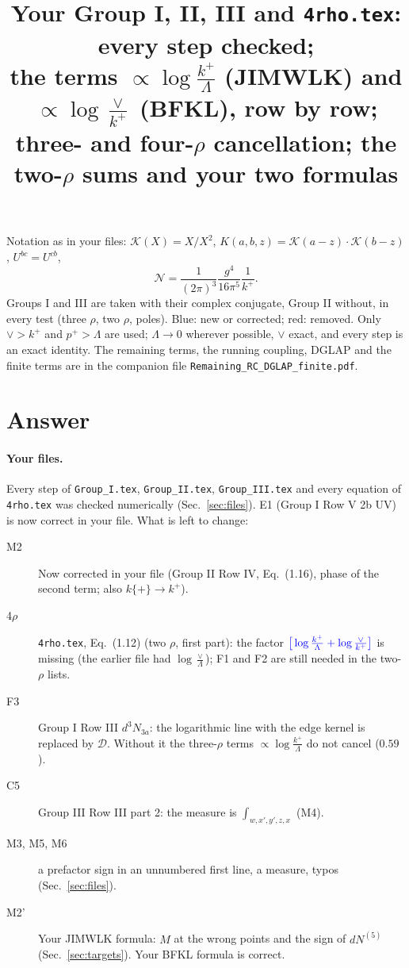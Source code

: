 \documentclass[10pt]{article}
\title{Your Group I, II, III and \texttt{4rho.tex}: every step checked;\\ the terms $\propto\log\frac{k^+}{\Lambda}$ (JIMWLK) and $\propto\log\frac{\vee}{k^+}$ (BFKL), row by row;\\ three- and four-$\rho$ cancellation; the two-$\rho$ sums and your two formulas}
\date{}
\numberwithin{equation}{section}
\newcommand{\new}[1]{{\color{blue}#1}}
\newcommand{\old}[1]{{\color{red}#1}}
\begin{document}
\maketitle
\noindent Notation as in your files: $\mathcal K(X)=X/X^2$, $K(a,b,z)=\mathcal K(a-z)\cdot\mathcal K(b-z)$, $U^{bc}=U^{cb}$,
\begin{equation*}
\mathcal N=\frac{1}{(2\pi)^3}\frac{g^4}{16\pi^5}\frac{1}{k^+}.
\end{equation*}
Groups I and III are taken with their complex conjugate, Group II without, in every test (three $\rho$, two $\rho$, poles). \new{Blue}: new or corrected; \old{red}: removed. Only $\vee>k^+$ and $p^+>\Lambda$ are used; $\Lambda\to0$ wherever possible, $\vee$ exact, and every step is an exact identity. The remaining terms, the running coupling, DGLAP and the finite terms are in the companion file \texttt{Remaining\_RC\_DGLAP\_finite.pdf}.

\section{Answer}\label{sec:answer}
\paragraph{Your files.} Every step of \texttt{Group\_I.tex}, \texttt{Group\_II.tex}, \texttt{Group\_III.tex} and every equation of \texttt{4rho.tex} was checked numerically (Sec.~\ref{sec:files}). E1 (Group I Row V 2b UV) is now correct in your file. What is left to change:
\begin{description}
\item[M2] \new{Now corrected in your file} (Group II Row IV, Eq.~(1.16), phase of the second term; also $k\{+\}\to k^+$).
\item[4$\rho$] \texttt{4rho.tex}, Eq.~(1.12) (two $\rho$, first part): the factor $\new{\big[\log\frac{k^+}{\Lambda}+\log\frac{\vee}{k^+}\big]}$ is missing (the earlier file had $\log\frac{\vee}{\Lambda}$); F1 and F2 are still needed in the two-$\rho$ lists.
\item[F3] Group I Row III $d^3N_{3a}$: the logarithmic line with the edge kernel is replaced by $\mathcal D$. Without it the three-$\rho$ terms $\propto\log\frac{k^+}{\Lambda}$ do not cancel ($0.59$).
\item[C5] Group III Row III part 2: the measure is $\int_{w,x',y',z,x}$ (M4).
\item[M3, M5, M6] a prefactor sign in an unnumbered first line, a measure, typos (Sec.~\ref{sec:files}).
\item[M2'] Your JIMWLK formula: $M$ at the wrong points and the sign of $dN^{(5)}$ (Sec.~\ref{sec:targets}). Your BFKL formula is correct.
\end{description}
\end{document}
